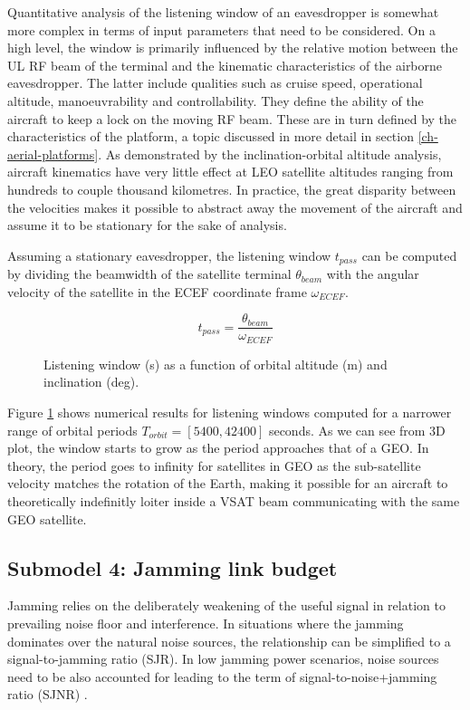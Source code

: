 \documentclass[english, 12pt, a4paper, elec, utf8, a-1b, online]{aaltothesis}
\begin{document}
Quantitative analysis of the listening window of an eavesdropper is somewhat more complex in terms of input parameters that need to be considered.
On a high level, the window is primarily influenced by the relative motion between the UL RF beam of the terminal and the kinematic characteristics of the airborne eavesdropper.
The latter include qualities such as cruise speed, operational altitude, manoeuvrability and controllability.
They define the ability of the aircraft to keep a lock on the moving RF beam.
These are in turn defined by the characteristics of the platform, a topic discussed in more detail in section \ref{ch-aerial-platforms}.
As demonstrated by the inclination-orbital altitude analysis, aircraft kinematics have very little effect at LEO satellite altitudes ranging from hundreds to couple thousand kilometres.
In practice, the great disparity between the velocities makes it possible to abstract away the movement of the aircraft and assume it to be stationary for the sake of analysis.

Assuming a stationary eavesdropper, the listening window ${t_{pass}}$ can be computed by dividing the beamwidth of the satellite terminal $\theta_{beam}$ with the angular velocity of the satellite in the ECEF coordinate frame $\omega_{ECEF}$.

\begin{equation}
  t_{pass} = \frac{\theta_{beam}}{\omega_{ECEF}}
\end{equation}

\begin{figure}[h]
  \centering
  
  \caption{Listening window (s) as a function of orbital altitude (m) and inclination (deg).}
  \label{fig-listening-window}
\end{figure}

Figure \ref{fig-listening-window} shows numerical results for listening windows computed for a narrower range of orbital periods $T_{orbit} = [5400, 42400]$ seconds.
As we can see from 3D plot, the window starts to grow as the period approaches that of a GEO. In theory, the period goes to infinity for satellites in GEO as the sub-satellite velocity matches the rotation of the Earth, making it possible for an aircraft to theoretically indefinitly loiter inside a VSAT beam communicating with the same GEO satellite.

\subsection{Submodel 4: Jamming link budget} \label{ch-results-submodel-4-link-budget}
Jamming relies on the deliberately weakening of the useful signal in relation to prevailing noise floor and interference. In situations where the jamming dominates over the natural noise sources, the relationship can be simplified to a signal-to-jamming ratio (SJR). In low jamming power scenarios, noise sources need to be also accounted for leading to the term of signal-to-noise+jamming ratio (SJNR) \cite{kosola2013digitaalinen}. %
\end{document}
